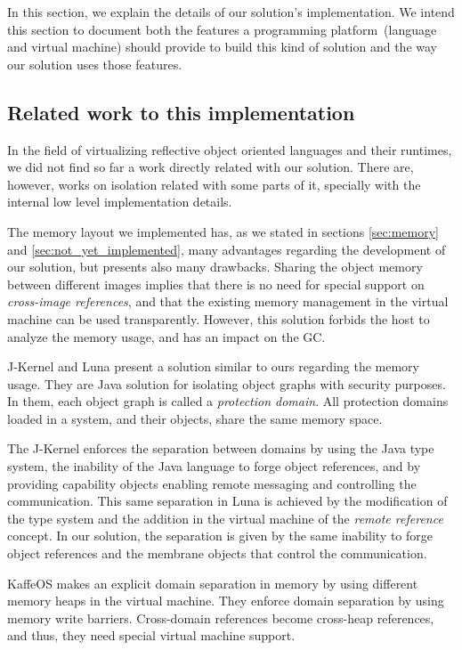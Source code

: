 In this section, we explain the details of our solution's implementation. We intend this section to document both the features a programming platform~(language and virtual machine) should provide to build this kind of solution and the way our solution uses those features.

\subsection{Related work to this implementation}
In the field of virtualizing reflective object oriented languages and their runtimes, we did not find so far a work directly related with our solution. There are, however, works on isolation related with some parts of it, specially with the internal low level implementation details.

The memory layout we implemented has, as we stated in sections \ref{sec:memory} and \ref{sec:not_yet_implemented}, many advantages regarding the development of our solution, but presents also many drawbacks. 
Sharing the object memory between different images implies that there is no need for special support on \emph{cross-image references}, and that the existing memory management in the virtual machine can be used transparently.
However, this solution forbids the host to analyze the \objectspace memory usage, and has an impact on the GC.

J-Kernel \cite{Hawb98a} and Luna \cite{Hawb02a} present a solution similar to ours regarding the memory usage. They are Java solution for isolating object graphs with security purposes. In them, each object graph is called a \emph{protection domain}. All protection domains loaded in a system, and their objects, share the same memory space. 

The J-Kernel enforces the separation between domains by using the Java type system, the inability of the Java language to forge object references, and by providing capability objects\cite{Levy84a,Mill03a,Spoo00a} enabling remote messaging and controlling the communication. This same separation in Luna \cite{Hawb02a} is achieved by the modification of the type system and the addition in the virtual machine of the \emph{remote reference} concept. In our solution, the separation is given by the same inability to forge object references and the membrane objects that control the communication.

KaffeOS \cite{Back00a} makes an explicit domain separation in memory by using different memory heaps in the virtual machine. They enforce domain separation by using memory write barriers. Cross-domain references become cross-heap references, and thus, they need special virtual machine support.

